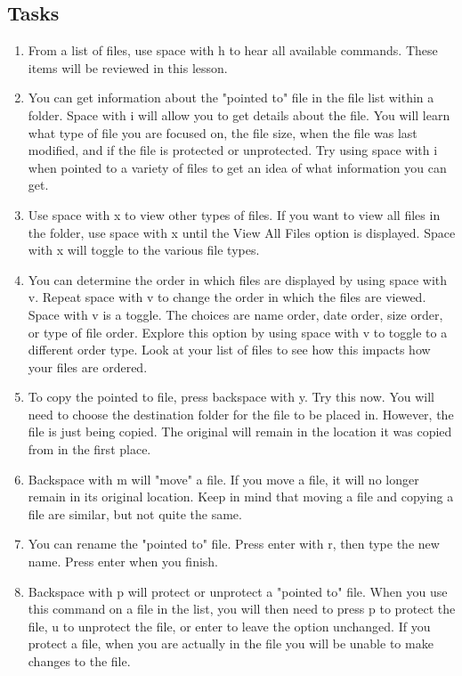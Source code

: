 \documentclass[10pt,letterpaper,twoside]{report}
\begin{document}
{{{\subsection{Tasks}
	      \begin{enumerate}
		      \item From a list of files, use space with h to hear all available commands.  These items will be reviewed in this lesson.
		      \item You can get information about the "pointed to" file in the file list within a folder.  Space with i will allow you to get details about the file.  You will learn what type of file you are focused on, the file size, when the file was last modified, and if the file is protected or unprotected.  Try using space with i when pointed to a variety of files to get an idea of what information you can get.
		      \item Use space with x to view other types of files.  If you want to view all files in the folder, use space with x until the View All Files option is displayed.  Space with x will toggle to the various file types.
		      \item You can determine the order in which files are displayed by using space with v.  Repeat space with v to change the order in which the files are viewed.  Space with v is a toggle.  The choices are name order, date order, size order, or type of file order.  Explore this option by using space with v to toggle to a different order type.  Look at your list of files to see how this impacts how your files are ordered.
		      \item To copy the pointed to file, press backspace with y.  Try this now.  You will need to choose the destination folder for the file to be placed in.  However, the file is just being copied.  The original will remain in the location it was copied from in the first place.
		      \item Backspace with m will "move" a file.  If you move a file, it will no longer remain in its original location.  Keep in mind that moving a file and copying a file are similar, but not quite the same.
		      \item You can rename the "pointed to" file.  Press enter with r, then type the new name.  Press enter when you finish.
		      \item Backspace with p will protect or unprotect a "pointed to" file.  When you use this command on a file in the list, you will then need to press p to protect the file, u to unprotect the file, or enter to leave the option unchanged.  If you protect a file, when you are actually in the file you will be unable to make changes to the file.

\end{enumerate}}}}
\end{document}
